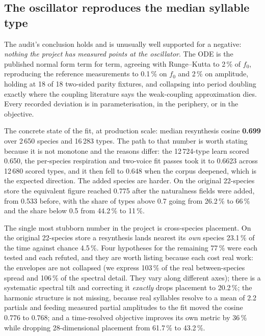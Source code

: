 \documentclass[10pt,twocolumn,a4paper]{article}
\begin{document}
\subsection{The oscillator reproduces the median syllable type}

The audit's conclusion holds and is unusually well supported for a negative:
\emph{nothing the project has measured points at the oscillator}. The ODE is the published
normal form term for term, agreeing with Runge--Kutta to 2\,\% of $f_0$, reproducing the
reference measurements to 0.1\,\% on $f_0$ and 2\,\% on amplitude, holding at 18 of 18
two-sided parity fixtures, and collapsing into period doubling exactly where the coupling
literature says the weak-coupling approximation dies. Every recorded deviation is in
parameterisation, in the periphery, or in the objective.

The concrete state of the fit, at production scale: median resynthesis cosine \textbf{0.699}
over 2\,650 species and 16\,283 types. The path to that number
is worth stating because it is not monotone and the reasons differ: the 12\,724-type learn
scored 0.650, the per-species respiration and two-voice fit passes took it to 0.6623 across
12\,680 scored types, and it then fell to 0.648 when the corpus deepened, which is the expected
direction. The added species are harder. On the original 22-species store the equivalent
figure reached 0.775 after the naturalness fields were added, from 0.533 before, with the share
of types above 0.7 going from 26.2\,\% to 66\,\% and the share below 0.5 from 44.2\,\% to
11\,\%.

The single most stubborn number in the project is cross-species placement. On the original
22-species store a resynthesis lands nearest its \emph{own} species 23.1\,\% of the time
against chance 4.5\,\%. Four hypotheses for the remaining 77\,\% were each tested and each
refuted, and they are worth listing because each cost real work: the envelopes are not
collapsed (we express 103\,\% of the real between-species spread and 106\,\% of the spectral
detail. They vary along different axes); there is a systematic spectral tilt and
correcting it \emph{exactly} drops placement to 20.2\,\%; the harmonic structure is not
missing, because real syllables resolve to a mean of 2.2 partials and feeding measured
partial amplitudes to the fit moved the cosine 0.776 to 0.768; and a time-resolved objective
improves its own metric by 36\,\% while dropping 28-dimensional placement from 61.7\,\% to
43.2\,\%.
\end{document}
